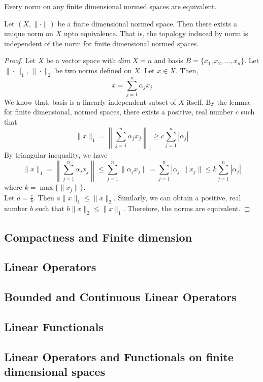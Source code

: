 \begin{theorem}
	Every norm on any finite dimensional normed spaces are equivalent.
\end{theorem}
\begin{commentary}
	Let $(X,\|\cdot\|)$ be a finite dimensional normed space.
	Then there exists a unique norm on $X$ upto equivalence.
	That is, the topology induced by norm is independent of the norm for finite dimensional normed spaces.	
\end{commentary}
\begin{proof}
	Let $X$ be a vector space with $dim\ X = n$ and basis $B = \{ x_1, x_2, \dots ,x_n \}$.
	Let $\|\cdot\|_1$, $\|\cdot\|_2$ be two norms defined on $X$.
	Let $x \in X$.
	Then,
	$$ x = \sum_{j=1}^n \alpha_j x_j $$
	We know that, basis is a linearly independent subset of $X$ itself.
	By the lemma for finite dimensional, normed spaces, there exists a positive, real number $c$ such that 
	$$ \| x \|_1 = \left\| \sum_{j=1}^n \alpha_j x_j \right\|_1 \ge c \sum_{j=1}^n |\alpha_j | $$
	By triangular inequality, we have
	$$ \| x \|_1 = \left\| \sum_{j=1}^n \alpha_j x_j \right\| \le \sum_{j=1}^n \| \alpha_j x_j \| = \sum_{j=1}^n |\alpha_j| \|x_j\| \le k \sum_{j=1}^n |\alpha_j|$$
	where $k = \max\{\|x_j\|\}$.\\

	Let $a = \frac{c}{k}$.
	Then $a\| x \|_1 \le \|x\|_2$.
	Similarly, we can obtain a positive, real number $b$ such that $b\| x \|_2 \le \| x \|_1$.
	Therefore, the norms are equivalent.
\end{proof}

\subsection{Compactness and Finite dimension}
\subsection{Linear Operators}
\subsection{Bounded and Continuous Linear Operators}
\subsection{Linear Functionals}
\subsection{Linear Operators and Functionals on finite dimensional spaces}
